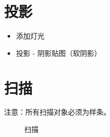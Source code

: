 \documentclass[UTF8,oneside]{ctexbook}
\begin{document}
\section{投影}
\begin{itemize}
    \item 添加灯光
    \item 投影 - 阴影贴图（软阴影）
\end{itemize}

\section{扫描}
注意：所有扫描对象必须为样条。
\begin{figure}[H]
	\centering
	\vspace{-0.3cm}
	\caption{扫描}\label{fig:sweep}
\end{figure}
\end{document}

